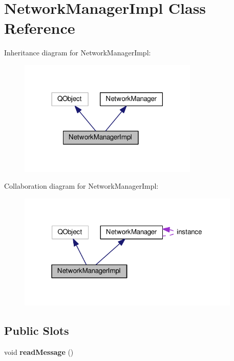 \hypertarget{classNetworkManagerImpl}{}\section{Network\+Manager\+Impl Class Reference}
\label{classNetworkManagerImpl}


Inheritance diagram for Network\+Manager\+Impl\+:
\nopagebreak
\begin{figure}[H]
\begin{center}
\leavevmode
\includegraphics[width=242pt]{d8/dbf/classNetworkManagerImpl__inherit__graph}
\end{center}
\end{figure}


Collaboration diagram for Network\+Manager\+Impl\+:
\nopagebreak
\begin{figure}[H]
\begin{center}
\leavevmode
\includegraphics[width=301pt]{d2/d03/classNetworkManagerImpl__coll__graph}
\end{center}
\end{figure}
\subsection*{Public Slots}
\begin{DoxyCompactItemize}
\item 
void {\bfseries read\+Message} ()\hypertarget{classNetworkManagerImpl_a607626213287dc476d3c7bd01c076b4e}{}\label{classNetworkManagerImpl_a607626213287dc476d3c7bd01c076b4e}

\end{DoxyCompactItemize}
